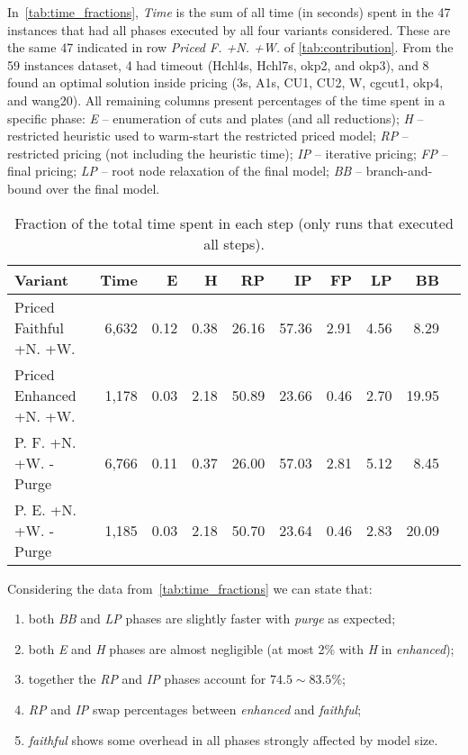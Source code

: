 \documentclass[smallextended]{svjour3}       %
\begin{document}
In~\autoref{tab:time_fractions}, \emph{Time} is the sum of all time (in seconds) spent in the 47 instances that had all phases executed by all four variants considered.
These are the same 47 indicated in row \emph{Priced F. +N. +W.} of \autoref{tab:contribution}.
From the 59 instances dataset, 4 had timeout (Hchl4s, Hchl7s, okp2, and okp3), and 8 found an optimal solution inside pricing (3s, A1s, CU1, CU2, W, cgcut1, okp4, and wang20).
All remaining columns present percentages of the time spent in a specific phase:
\emph{E} -- enumeration of cuts and plates (and all reductions);
\emph{H} -- restricted heuristic used to warm-start the restricted priced model;
\emph{RP} -- restricted pricing (not including the heuristic time);
\emph{IP} -- iterative pricing;
\emph{FP} -- final pricing;
\emph{LP} -- root node relaxation of the final model;
\emph{BB} -- branch-and-bound over the final model.

\begin{table}
\caption{Fraction of the total time spent in each step (only runs that executed all steps).}
\begin{tabular}{lrrrrrrrrr}
\hline\hline
Variant & Time & E & H & RP & IP & FP & LP & BB \\\hline
Priced Faithful +N. +W. & 6,632 & 0.12 & 0.38 & 26.16 & 57.36 & 2.91 & 4.56 & 8.29 \\
Priced Enhanced +N. +W. & 1,178 & 0.03 & 2.18 & 50.89 & 23.66 & 0.46 & 2.70 & 19.95 \\
P. F. +N. +W. -Purge & 6,766 & 0.11 & 0.37 & 26.00 & 57.03 & 2.81 & 5.12 & 8.45 \\
P. E. +N. +W. -Purge & 1,185 & 0.03 & 2.18 & 50.70 & 23.64 & 0.46 & 2.83 & 20.09 \\\hline\hline
\end{tabular}
\label{tab:time_fractions}
\end{table}

Considering the data from~\autoref{tab:time_fractions} we can state that:
\begin{enumerate}
\item both \emph{BB} and \emph{LP} phases are slightly faster with \emph{purge} as expected;
\item both \emph{E} and \emph{H} phases are almost negligible (at most 2\% with \emph{H} in \emph{enhanced});
\item together the \emph{RP} and \emph{IP} phases account for \(74.5\sim83.5\)\%;
\item \emph{RP} and \emph{IP} swap percentages between \emph{enhanced} and \emph{faithful};
\item \emph{faithful} shows some overhead in all phases strongly affected by model size.
\end{enumerate}
\end{document}
